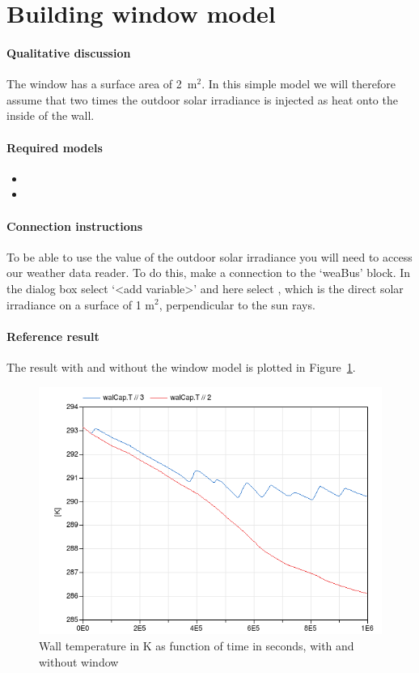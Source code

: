 \documentclass[10pt,a4paper]{article}
\begin{document}
\section{Building window model}
\paragraph{Qualitative discussion}
The window has a surface area of 2~m$^2$. 
In this simple model we will therefore assume that two times the
outdoor solar irradiance is injected as heat onto the inside of the wall.

\paragraph{Required models}
\begin{itemize}
\item {}
\item {}
\end{itemize}

\paragraph{Connection instructions}
To be able to use the value of the outdoor solar irradiance
you will need to access our weather data reader.
To do this, make a connection to the `weaBus' block. 
In the dialog box select `\textless add variable\textgreater' and here
select , 
which is the direct solar irradiance on a surface
of 1 m$^2$, perpendicular to the sun rays. 

\paragraph{Reference result}
The result with and without the window model
is plotted in Figure~\ref{fig:res2}.

\begin{figure}
\centering
\includegraphics[scale=0.6]{result2.png}
\caption{Wall temperature in K as function of time in seconds,
with and without window}
\label{fig:res2}
\end{figure}
\end{document}
